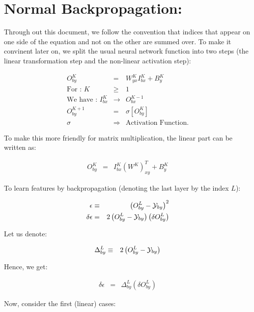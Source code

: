\section{Normal Backpropagation:}

Through out this document, we follow the convention that indices that
appear on one side of the equation and not on the other are summed
over. To make it convinent later on, we split the usual neural network
function into two steps (the linear transformation step and the non-linear
activation step):

\begin{eqnarray*}
    O_{by}^{K} & = & W_{yx}^{K}I_{bx}^{K}+B_{y}^{K}\\
    \text{For : }K & \ge & 1\\
    \text{We have : }I_{bx}^{K} & \rightarrow & O_{bx}^{K-1}\\
    O_{by}^{K+1} & = & \sigma\left[O_{by}^{K}\right]\\
    \sigma & \Rightarrow & \text{Activation Function.}
\end{eqnarray*}

To make this more friendly for matrix multiplication, the linear part
can be written as:

\begin{eqnarray*}
    O_{by}^{K} & = & I_{bx}^{K}\left(W^{K}\right)_{xy}^{T}+B_{y}^{K}
\end{eqnarray*}

To learn features by backpropagation (denoting the last layer by the
index $L$):

\begin{eqnarray*}
    \epsilon & \equiv & \left(O_{by}^{L}-{\cal Y}_{by}\right)^{2}\\
    \delta\epsilon & = & 2\left(O_{by}^{L}-{\cal Y}_{by}\right)\left(\delta O_{by}^{L}\right)
\end{eqnarray*}

Let us denote:

\begin{eqnarray*}
    \Delta_{by}^{L} & \equiv & 2\left(O_{by}^{L}-{\cal Y}_{by}\right)
\end{eqnarray*}

Hence, we get:

\begin{eqnarray*}
    \delta\epsilon & = & \Delta_{by}^{L}\left(\delta O_{by}^{L}\right)
\end{eqnarray*}

Now, consider the first (linear) cases:


